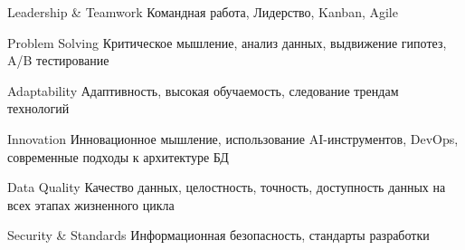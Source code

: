 

\begin{cvskills}

  \cvskill
    {Leadership \& Teamwork} %
    {Командная работа, Лидерство, Kanban, Agile} %

  \cvskill
    {Problem Solving} %
    {Критическое мышление, анализ данных, выдвижение гипотез, A/B тестирование} %

  \cvskill
    {Adaptability} %
    {Адаптивность, высокая обучаемость, следование трендам технологий} %

  \cvskill
    {Innovation} %
    {Инновационное мышление, использование AI-инструментов, DevOps, современные подходы к архитектуре БД} %

  \cvskill
    {Data Quality} %
    {Качество данных, целостность, точность, доступность данных на всех этапах жизненного цикла} %

  \cvskill
    {Security \& Standards} %
    {Информационная безопасность, стандарты разработки} %

\end{cvskills}
